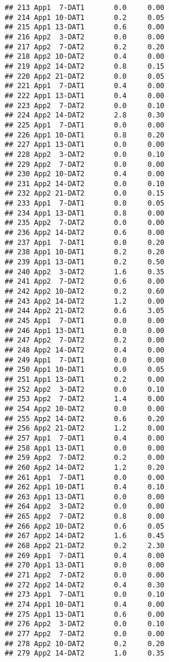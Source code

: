 \documentclass[
]{article}
\begin{document}
\begin{verbatim}
## 213 App1  7-DAT1       0.0     0.00
## 214 App1 10-DAT1       0.2     0.05
## 215 App1 13-DAT1       0.6     0.00
## 216 App2  3-DAT2       0.0     0.00
## 217 App2  7-DAT2       0.2     0.20
## 218 App2 10-DAT2       0.4     0.00
## 219 App2 14-DAT2       0.8     0.15
## 220 App2 21-DAT2       0.0     0.05
## 221 App1  7-DAT1       0.4     0.00
## 222 App1 13-DAT1       0.4     0.00
## 223 App2  7-DAT2       0.0     0.10
## 224 App2 14-DAT2       2.8     0.30
## 225 App1  7-DAT1       0.0     0.00
## 226 App1 10-DAT1       0.8     0.20
## 227 App1 13-DAT1       0.0     0.00
## 228 App2  3-DAT2       0.0     0.10
## 229 App2  7-DAT2       0.0     0.00
## 230 App2 10-DAT2       0.4     0.00
## 231 App2 14-DAT2       0.0     0.10
## 232 App2 21-DAT2       0.0     0.15
## 233 App1  7-DAT1       0.0     0.05
## 234 App1 13-DAT1       0.8     0.00
## 235 App2  7-DAT2       0.0     0.00
## 236 App2 14-DAT2       0.6     0.00
## 237 App1  7-DAT1       0.0     0.20
## 238 App1 10-DAT1       0.2     0.20
## 239 App1 13-DAT1       0.2     0.50
## 240 App2  3-DAT2       1.6     0.35
## 241 App2  7-DAT2       0.6     0.00
## 242 App2 10-DAT2       0.2     0.60
## 243 App2 14-DAT2       1.2     0.00
## 244 App2 21-DAT2       0.6     3.05
## 245 App1  7-DAT1       0.0     0.00
## 246 App1 13-DAT1       0.0     0.00
## 247 App2  7-DAT2       0.2     0.00
## 248 App2 14-DAT2       0.4     0.00
## 249 App1  7-DAT1       0.0     0.00
## 250 App1 10-DAT1       0.0     0.05
## 251 App1 13-DAT1       0.2     0.00
## 252 App2  3-DAT2       0.0     0.10
## 253 App2  7-DAT2       1.4     0.00
## 254 App2 10-DAT2       0.0     0.00
## 255 App2 14-DAT2       0.6     0.20
## 256 App2 21-DAT2       1.2     0.00
## 257 App1  7-DAT1       0.4     0.00
## 258 App1 13-DAT1       0.0     0.00
## 259 App2  7-DAT2       0.2     0.00
## 260 App2 14-DAT2       1.2     0.20
## 261 App1  7-DAT1       0.0     0.00
## 262 App1 10-DAT1       0.4     0.10
## 263 App1 13-DAT1       0.0     0.00
## 264 App2  3-DAT2       0.0     0.00
## 265 App2  7-DAT2       0.8     0.00
## 266 App2 10-DAT2       0.6     0.05
## 267 App2 14-DAT2       1.6     0.45
## 268 App2 21-DAT2       0.2     2.30
## 269 App1  7-DAT1       0.4     0.00
## 270 App1 13-DAT1       0.0     0.00
## 271 App2  7-DAT2       0.0     0.00
## 272 App2 14-DAT2       0.4     0.30
## 273 App1  7-DAT1       0.0     0.10
## 274 App1 10-DAT1       0.4     0.00
## 275 App1 13-DAT1       0.6     0.00
## 276 App2  3-DAT2       0.0     0.10
## 277 App2  7-DAT2       0.0     0.00
## 278 App2 10-DAT2       0.2     0.20
## 279 App2 14-DAT2       1.0     0.35

\end{verbatim}
\end{document}
